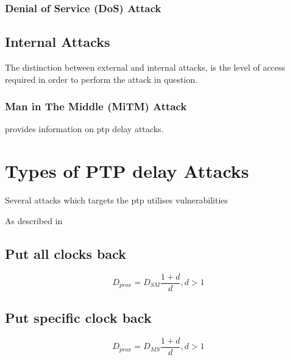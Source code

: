 \subsubsection{Denial of Service (DoS) Attack}


\subsection{Internal Attacks}
The distinction between external and internal attacks, is the level of access required in order to perform the attack in question.

\subsubsection{Man in The Middle (MiTM) Attack}



\cite{itkin2017security} provides information on \acrshort{ptp} delay attacks.





\section{Types of PTP delay Attacks}
Several attacks which targets the \acrlong{ptp}  utilises vulnerabilities 



As described in \cite{ullmann2009delay}
\subsection{Put all clocks back}

\begin{equation} \label{DSM}
    D_{prox}=D_{SM}\frac{1+d}{d},d>1 
\end{equation}
\subsection{Put specific clock back}
\begin{equation} \label{DMS}
    D_{prox}=D_{MS}\frac{1+d}{d},d>1 
\end{equation}

\cite{finkenzeller2022feasible}